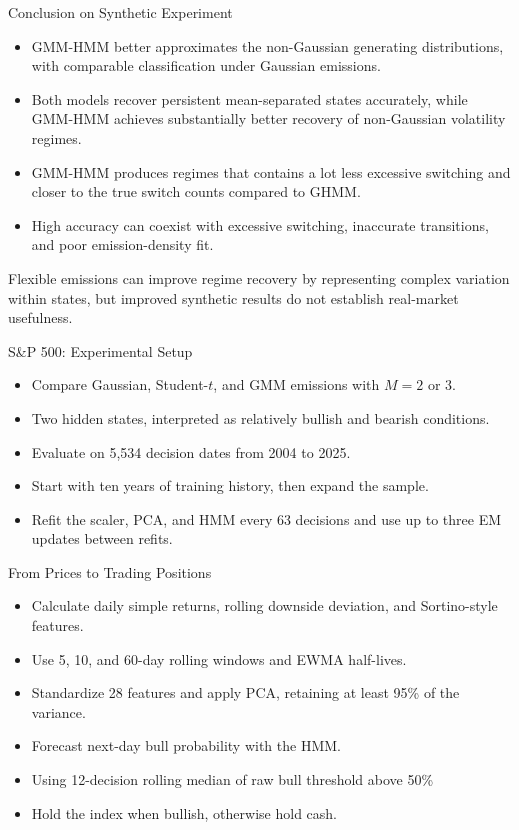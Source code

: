 \begin{frame}{Conclusion on Synthetic Experiment}

    \begin{itemize}
    \item GMM-HMM better approximates the non-Gaussian generating distributions, with comparable classification under Gaussian emissions.

    \item Both models recover persistent mean-separated states accurately, while GMM-HMM achieves substantially better recovery of non-Gaussian volatility regimes.

    \item GMM-HMM produces regimes that contains a lot less excessive switching and closer to the true switch counts compared to GHMM.

    \item High accuracy can coexist with excessive switching, inaccurate transitions, and poor emission-density fit.
\end{itemize}

Flexible emissions can improve regime recovery by representing
complex variation within states, but improved synthetic results
do not establish real-market usefulness.
\end{frame}

\begin{frame}{S\&P 500: Experimental Setup}
\begin{itemize}
    \item Compare Gaussian, Student-$t$, and GMM emissions with $M=2$ or $3$.
    \item Two hidden states, interpreted as relatively bullish and bearish conditions.
    \item Evaluate on 5,534 decision dates from 2004 to 2025.
    \item Start with ten years of training history, then expand the sample.
    \item Refit the scaler, PCA, and HMM every 63 decisions and use up to three EM updates between refits.
\end{itemize}
\end{frame}

\begin{frame}{From Prices to Trading Positions}
\begin{itemize}
    \item Calculate daily simple returns, rolling downside deviation, and Sortino-style features.
    \item Use 5, 10, and 60-day rolling windows and EWMA half-lives.
    \item Standardize 28 features and apply PCA, retaining at least 95\% of the variance.
    \item Forecast next-day bull probability with the HMM.
    \item Using 12-decision rolling median of raw bull threshold above 50\%
    \item Hold the index when bullish, otherwise hold cash.
\end{itemize}
\end{frame}

